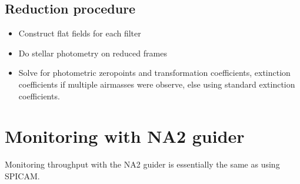 \documentclass{article}
\begin{document}
\subsection{Reduction procedure}

\begin{itemize}
\item Construct flat fields for each filter

\item Do stellar photometry on reduced frames

\item Solve for photometric zeropoints and transformation coefficients,
extinction coefficients if multiple airmasses were observe, else using
standard extinction coefficients.
\end{itemize}

\section{Monitoring with NA2 guider}

Monitoring throughput with the NA2 guider is essentially the same as
using SPICAM.
\end{document}

